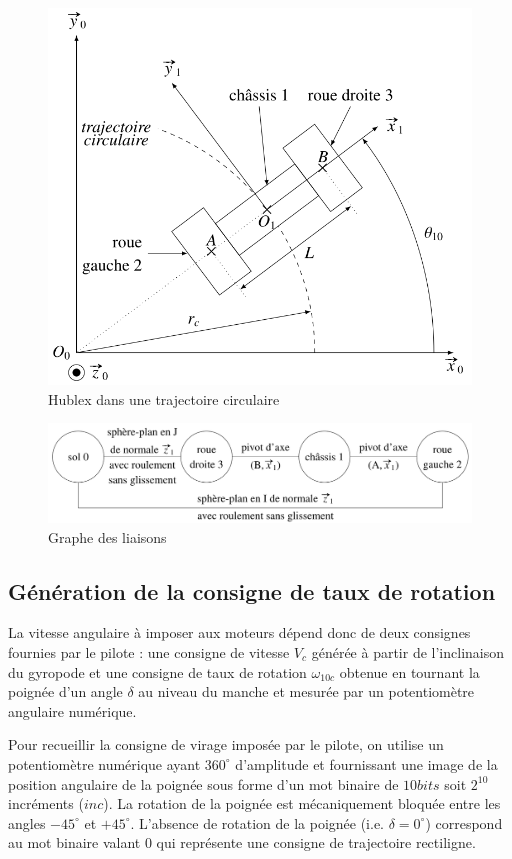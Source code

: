 \begin{figure}[ht!]
 \begin{center}
 \includegraphics[width=.5\linewidth]{img/fig08}
 \caption{\label{fig08}Hublex dans une trajectoire circulaire}
 \end{center}
\end{figure}

\begin{figure}[ht!]
 \begin{center}
 \includegraphics[width=.85\linewidth]{img/fig09}
 \caption{\label{fig09}Graphe des liaisons}
 \end{center}
\end{figure}

\subsection{Génération de la consigne de taux de rotation}

La vitesse angulaire à imposer aux moteurs dépend donc de deux consignes fournies par le pilote : une consigne de vitesse $V_c$ générée à partir de l'inclinaison du gyropode et une consigne de taux de rotation $\omega_{10c}$ obtenue en tournant la poignée d'un angle $\delta$ au niveau du manche et mesurée par un potentiomètre angulaire numérique.

Pour recueillir la consigne de virage imposée par le pilote, on utilise un potentiomètre numérique ayant $360^{\circ}$ d'amplitude et fournissant une image de la position angulaire de la poignée sous forme d'un mot binaire de $10 bits$ soit $2^{10}$ incréments ($inc$). La rotation de la poignée est mécaniquement bloquée entre les angles $-45^{\circ}$ et $+45^{\circ}$. L'absence de rotation de la poignée (i.e. $\delta=0^{\circ}$) correspond au mot binaire valant 0 qui représente une consigne de trajectoire rectiligne.

